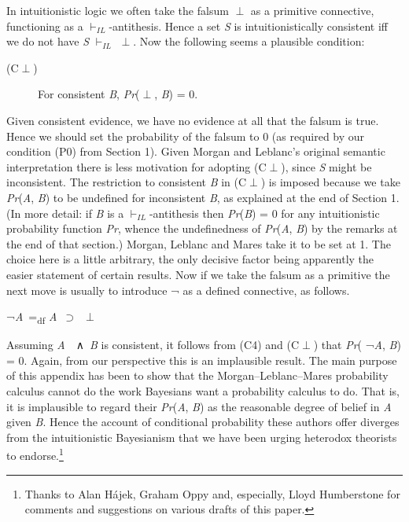 \documentclass[
  11pt,
  letterpaper,
  DIV=11,
  numbers=noendperiod,
  twoside]{scrartcl}
\begin{document}
In intuitionistic logic we often take the falsum \({\perp}\) as a
primitive connective, functioning as a \(\vdash_{IL}\)-antithesis. Hence
a set \emph{S} is intuitionistically consistent iff we do not have
\emph{S} \(\vdash_{IL}\) \({\perp}\). Now the following seems a
plausible condition:

\begin{description}
\item[(C\({\perp}\))]
For consistent \emph{B}, \emph{Pr}(\({\perp}\), \emph{B}) = 0.
\end{description}

Given consistent evidence, we have no evidence at all that the falsum is
true. Hence we should set the probability of the falsum to 0 (as
required by our condition (P0) from Section 1). Given Morgan and
Leblanc's original semantic interpretation there is less motivation for
adopting (C\({\perp}\)), since \emph{S} might be inconsistent. The
restriction to consistent \emph{B} in (C\({\perp}\)) is imposed because
we take \emph{Pr}(\emph{A}, \emph{B}) to be undefined for inconsistent
\emph{B}, as explained at the end of Section 1. (In more detail: if
\emph{B} is a \(\vdash_{IL}\)-antithesis then \emph{Pr}(\emph{B}) = 0
for any intuitionistic probability function \emph{Pr}, whence the
undefinedness of \emph{Pr}(\emph{A}, \emph{B}) by the remarks at the end
of that section.) Morgan, Leblanc and Mares take it to be set at 1. The
choice here is a little arbitrary, the only decisive factor being
apparently the easier statement of certain results. Now if we take the
falsum as a primitive the next move is usually to introduce ¬ as a
defined connective, as follows.

¬\emph{A}~=\textsubscript{df} \emph{A}~\({\supset}\)~\({\perp}\)

Assuming \emph{A}~~∧~\emph{B} is consistent, it follows from (C4) and
(C\({\perp}\)) that \emph{Pr}( ¬\emph{A}, \emph{B}) = 0. Again, from our
perspective this is an implausible result. The main purpose of this
appendix has been to show that the Morgan--Leblanc--Mares probability
calculus cannot do the work Bayesians want a probability calculus to do.
That is, it is implausible to regard their \emph{Pr}(\emph{A}, \emph{B})
as the reasonable degree of belief in \emph{A} given \emph{B}. Hence the
account of conditional probability these authors offer diverges from the
intuitionistic Bayesianism that we have been urging heterodox theorists
to endorse.\footnote{Thanks to Alan Hájek, Graham Oppy and, especially,
  Lloyd Humberstone for comments and suggestions on various drafts of
  this paper.}
\end{document}

